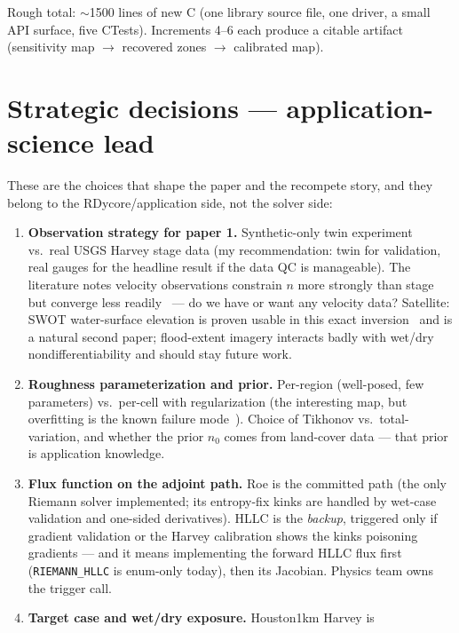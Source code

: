 \documentclass[11pt]{article}
\begin{document}
Rough total: $\sim$1500 lines of new C (one library source file, one
driver, a small API surface, five CTests). Increments 4--6 each produce a
citable artifact (sensitivity map $\rightarrow$ recovered zones
$\rightarrow$ calibrated map).

\section{Strategic decisions --- application-science lead}
\label{sec:decisions}

These are the choices that shape the paper and the recompete story, and
they belong to the RDycore/application side, not the solver side:

\begin{enumerate}[nosep]
  \item \textbf{Observation strategy for paper 1.} Synthetic-only twin
        experiment vs.\ real USGS Harvey stage data (my recommendation:
        twin for validation, real gauges for the headline result if the
        data QC is manageable). The literature notes velocity observations
        constrain $n$ more strongly than stage but converge less
        readily~\cite{yan2014adjoint} --- do we have or want any velocity
        data? Satellite: SWOT water-surface elevation is proven usable in
        this exact inversion~\cite{brisset2018swot} and is a natural second
        paper; flood-extent imagery interacts badly with wet/dry
        nondifferentiability and should stay future work.
  \item \textbf{Roughness parameterization and prior.} Per-region
        (well-posed, few parameters) vs.\ per-cell with regularization
        (the interesting map, but overfitting is the known
        failure mode~\cite{warder2021storm}). Choice of Tikhonov vs.\
        total-variation, and whether the prior $n_0$ comes from land-cover
        data --- that prior is application knowledge.
  \item \textbf{Flux function on the adjoint path.} Roe is the
        committed path (the only Riemann solver implemented; its
        entropy-fix kinks are handled by wet-case validation and
        one-sided derivatives). HLLC is the \emph{backup}, triggered
        only if gradient validation or the Harvey calibration shows the
        kinks poisoning gradients --- and it means implementing the
        forward HLLC flux first (\texttt{RIEMANN\_HLLC} is enum-only
        today), then its Jacobian. Physics team owns the trigger call.
  \item \textbf{Target case and wet/dry exposure.} Houston1km Harvey is

\end{enumerate}
\end{document}
